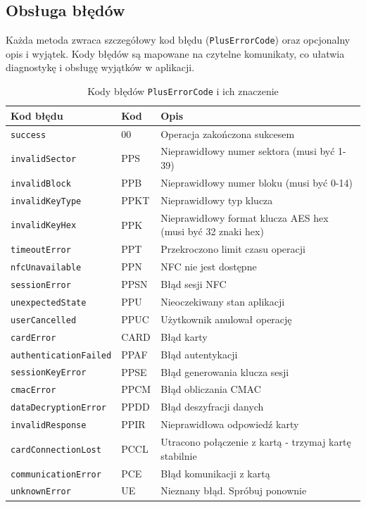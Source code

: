 \documentclass[a4paper,12pt]{article}
\begin{document}
\subsection{Obsługa błędów}
Każda metoda zwraca szczegółowy kod błędu (\texttt{PlusErrorCode}) oraz opcjonalny opis i wyjątek. Kody błędów są mapowane na czytelne komunikaty, co ułatwia diagnostykę i obsługę wyjątków w aplikacji.

\begin{table}[h!]
\centering
\begin{tabular}{|l|l|p{6cm}|}
\hline
\textbf{Kod błędu} & \textbf{Kod} & \textbf{Opis} \\
\hline
\texttt{success} & 00 & Operacja zakończona sukcesem \\
\hline
\texttt{invalidSector} & PPS & Nieprawidłowy numer sektora (musi być 1-39) \\
\hline
\texttt{invalidBlock} & PPB & Nieprawidłowy numer bloku (musi być 0-14) \\
\hline
\texttt{invalidKeyType} & PPKT & Nieprawidłowy typ klucza \\
\hline
\texttt{invalidKeyHex} & PPK & Nieprawidłowy format klucza AES hex (musi być 32 znaki hex) \\
\hline
\texttt{timeoutError} & PPT & Przekroczono limit czasu operacji \\
\hline
\texttt{nfcUnavailable} & PPN & NFC nie jest dostępne \\
\hline
\texttt{sessionError} & PPSN & Błąd sesji NFC \\
\hline
\texttt{unexpectedState} & PPU & Nieoczekiwany stan aplikacji \\
\hline
\texttt{userCancelled} & PPUC & Użytkownik anulował operację \\
\hline
\texttt{cardError} & CARD & Błąd karty \\
\hline
\texttt{authenticationFailed} & PPAF & Błąd autentykacji \\
\hline
\texttt{sessionKeyError} & PPSE & Błąd generowania klucza sesji \\
\hline
\texttt{cmacError} & PPCM & Błąd obliczania CMAC \\
\hline
\texttt{dataDecryptionError} & PPDD & Błąd deszyfracji danych \\
\hline
\texttt{invalidResponse} & PPIR & Nieprawidłowa odpowiedź karty \\
\hline
\texttt{cardConnectionLost} & PCCL & Utracono połączenie z kartą - trzymaj kartę stabilnie \\
\hline
\texttt{communicationError} & PCE & Błąd komunikacji z kartą \\
\hline
\texttt{unknownError} & UE & Nieznany błąd. Spróbuj ponownie \\
\hline
\end{tabular}
\caption{Kody błędów \texttt{PlusErrorCode} i ich znaczenie}
\end{table}
\end{document}
